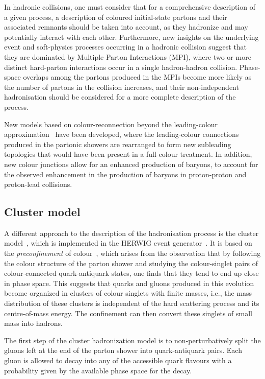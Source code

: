 In hadronic collisions, one must consider that for a comprehensive description of a given process, a description of coloured initial-state partons and their associated remnants should be taken into account, as they hadronize and may potentially interact with each other. Furthermore, new insights on the underlying event and soft-physics processes occurring in a hadronic collision suggest that they are dominated by Multiple Parton Interactions (MPI), where two or more distinct hard-parton interactions occur in a single hadron-hadron collision. Phase-space overlaps among the partons produced in the MPIs become more likely as the number of partons in the collision increases, and their non-independent hadronisation should be considered for a more complete description of the process. 

New models based on colour-reconnection beyond the leading-colour approximation~\cite{Christiansen:2015yqa} have been developed, where the leading-colour connections produced in the partonic showers are rearranged to form new subleading topologies that would have been present in a full-colour treatment. In addition, new colour junctions allow for an enhanced production of baryons, to account for the observed enhancement in the production of baryons in proton-proton and proton-lead collisions.

\subsection{Cluster model}
A different approach to the description of the hadronisation process is the cluster model~\cite{Webber:1983if}, which is implemented in the HERWIG event generator~\cite{Bahr:2008pv}. It is based on the \emph{preconfinement} of colour~\cite{Amati:1979fg}, which arises from the observation that by following the colour structure of the parton shower and studying the colour-singlet pairs of colour-connected quark-antiquark states, one finds that they tend to end up close in phase space. This suggests that quarks and gluons produced in this evolution become organized in clusters of colour singlets with finite masses, i.e., the mass distribution of these clusters is independent of the hard scattering process and its centre-of-mass energy. The confinement can then convert these singlets of small mass into hadrons. 

The first step of the cluster hadronization model is to non-perturbatively split the gluons left at the end of the parton shower into quark-antiquark pairs. Each gluon is allowed to decay into any of the accessible quark flavours with a probability given by the available phase space for the decay. 

